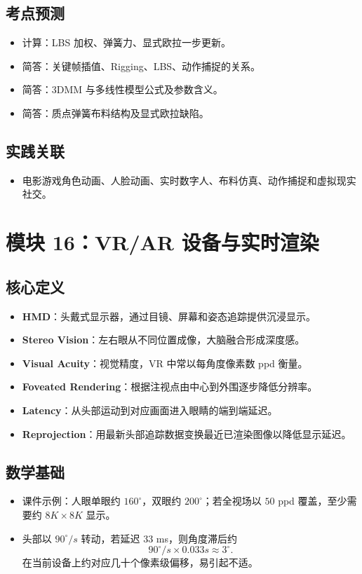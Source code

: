 \documentclass[UTF8,zihao=-4,scheme=chinese,fontset=fandol]{ctexart}
\newcommand{\key}[1]{\textbf{#1}}
\begin{document}
\subsection{考点预测}
\begin{itemize}
  \item 计算：LBS 加权、弹簧力、显式欧拉一步更新。
  \item 简答：关键帧插值、Rigging、LBS、动作捕捉的关系。
  \item 简答：3DMM 与多线性模型公式及参数含义。
  \item 简答：质点弹簧布料结构及显式欧拉缺陷。
\end{itemize}

\subsection{实践关联}
\begin{itemize}
  \item 电影游戏角色动画、人脸动画、实时数字人、布料仿真、动作捕捉和虚拟现实社交。
\end{itemize}

\section{模块 16：VR/AR 设备与实时渲染}

\subsection{核心定义}
\begin{itemize}
  \item \key{HMD}：头戴式显示器，通过目镜、屏幕和姿态追踪提供沉浸显示。
  \item \key{Stereo Vision}：左右眼从不同位置成像，大脑融合形成深度感。
  \item \key{Visual Acuity}：视觉精度，VR 中常以每角度像素数 ppd 衡量。
  \item \key{Foveated Rendering}：根据注视点由中心到外围逐步降低分辨率。
  \item \key{Latency}：从头部运动到对应画面进入眼睛的端到端延迟。
  \item \key{Reprojection}：用最新头部追踪数据变换最近已渲染图像以降低显示延迟。
\end{itemize}

\subsection{数学基础}
\begin{itemize}
  \item 课件示例：人眼单眼约 $160^\circ$，双眼约 $200^\circ$；若全视场以 $50$ ppd 覆盖，至少需要约 $8K\times8K$ 显示。
  \item 头部以 $90^\circ/s$ 转动，若延迟 $33$ ms，则角度滞后约
  \[
  90^\circ/s\times0.033s\approx3^\circ.
  \]
  在当前设备上约对应几十个像素级偏移，易引起不适。
\end{itemize}
\end{document}
